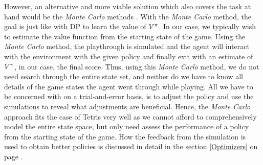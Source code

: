 However, an alternative and more viable solution
which also covers the task at hand would be the \textit{Monte Carlo} methods \citep{Csaba}. 
With the \textit{Monte Carlo} method, the goal is just like with DP
to learn
the value of $V^{\pi}$. In our case, 
we typically wish to estimate the value function from the starting 
state of the game. Using the \textit{Monte Carlo} method, the playthrough is simulated 
and the agent will interact with the environment with the given policy
and finally exit with an estimate of $V^{\pi}$,
in our case, the final score. Thus, using this \textit{Monte Carlo} method, we do not need search 
through the entire state set, and neither do we have to know all
details of the game states the agent went through while playing.
All we have to be concerned with on a trial-and-error basis, is to
adjust the policy and use the simulations to reveal what adjustments 
are beneficial.
Hence, the \textit{Monte Carlo} approach fits the case of Tetris
very well as we cannot afford to comprehensively  model the entire 
state space, but only need assess the performance of a policy from the 
starting state of the game.
How the feedback from the simulation is used to obtain better policies
is discussed in detail in the section 
\ref{Optimizers} on page \pageref{Optimizers}.










 


